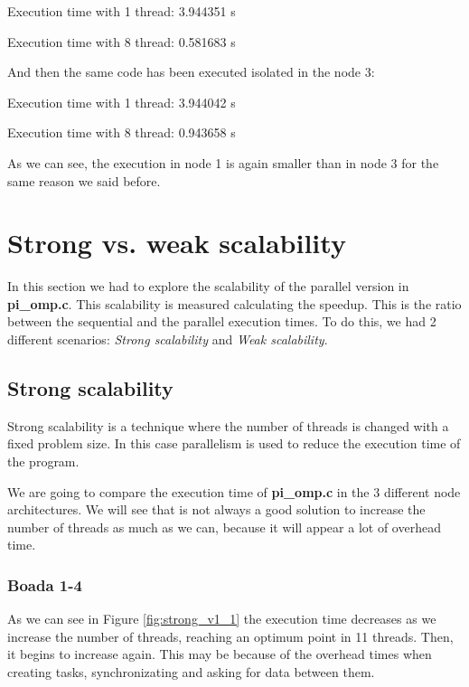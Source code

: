 \documentclass[12pt, a4paper]{article}
\begin{document}
Execution time with 1 thread: 3.944351 s

Execution time with 8 thread: 0.581683 s\newline

And then the same code has been executed isolated in the node 3:\newline

Execution time with 1 thread: 3.944042 s

Execution time with 8 thread: 0.943658 s\newline

As we can see, the execution in node 1 is again smaller than in node 3 for the same reason we said before.

\section{Strong vs. weak scalability}

In this section we had to explore the scalability of the parallel version in \textbf{pi\_omp.c}. This scalability is measured calculating the speedup. This is the ratio between the sequential and the parallel execution times. To do this, we had 2 different scenarios: \textit{Strong scalability} and \textit{Weak scalability}.

\subsection{Strong scalability}

Strong scalability is a technique where the number of threads is changed with a fixed problem size. In this case parallelism is used to reduce the execution time of the program.

We are going to compare the execution time of \textbf{pi\_omp.c} in the 3 different node architectures. We will see that is not always a good solution to increase the number of threads as much as we can, because it will appear a lot of overhead time.

\subsubsection{Boada 1-4}

As we can see in Figure \ref{fig:strong_v1_1} the execution time decreases as we increase the number of threads, reaching an optimum point in 11 threads. Then, it begins to increase again. This may be because of the overhead times when creating tasks, synchronizating and asking for data between them.
\end{document}
